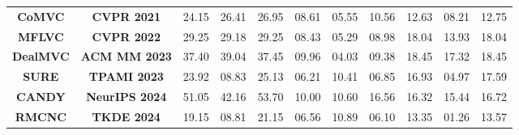\documentclass{article}
\theoremstyle{plain}
\theoremstyle{definition}
\theoremstyle{remark}
\begin{document}
\begin{itemize}
\begin{table}[]
{\begin{tabular}{cc|ccc|ccc|ccc}
\multicolumn{1}{c|}{\textbf{CoMVC}}   & \textbf{CVPR 2021}    & 24.15                                 & 26.41                                 & 26.95                                 & 08.61                                 & 05.55                                 & 10.56                                 & 12.63                                 & 08.21                                 & 12.75                                 \\
\multicolumn{1}{c|}{\textbf{MFLVC}}   & \textbf{CVPR 2022}    & 29.25                                 & 29.18                                 & 29.25                                 & 08.43                                 & 05.29                                 & 08.98                                 & 18.04                                 & 13.93                                 & 18.04                                 \\
\multicolumn{1}{c|}{\textbf{DealMVC}} & \textbf{ACM MM 2023}  & 37.40                                 & 39.04                                 & 37.45                                 & 09.96                                 & 04.03                                 & 09.38                                 & {\color[HTML]{3531FF} 18.45}          & 17.32                                 & 18.45                                 \\
\multicolumn{1}{c|}{\textbf{SURE}}    & \textbf{TPAMI 2023}   & 23.92                                 & 08.83                                 & 25.13                                 & 06.21                                 & 10.41                                 & 06.85                                 & 16.93                                 & 04.97                                 & 17.59                                 \\
\multicolumn{1}{c|}{\textbf{CANDY}}   & \textbf{NeurIPS 2024} & 51.05                                 & 42.16                                 & 53.70                                 & 10.00                                 & 10.60                                 & 16.56                                 & 16.32                                 & 15.44                                 & 16.72                                 \\
\multicolumn{1}{c|}{\textbf{RMCNC}}   & \textbf{TKDE 2024}    & 19.15                                 & 08.81                                 & 21.15                                 & 06.56                                 & 10.89                                 & 06.10                                 & 13.35                                 & 01.26                                 & 13.57                                 \\

\end{tabular}}
\end{table}
\end{itemize}
\end{document}
